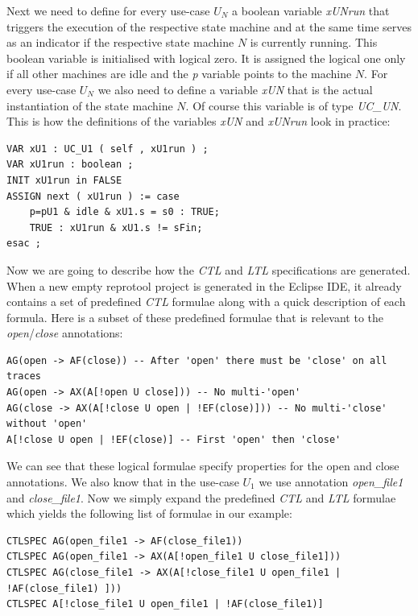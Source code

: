 Next we need to define for every use-case $U_N$ a boolean variable \emph{xUNrun} that triggers the execution of the respective state machine and at the same time serves as an indicator if the respective state machine $N$ is currently running.
This boolean variable is initialised with logical zero.
It is assigned the logical one only if all other machines are idle and the \emph{p} variable points to the machine $N$. For every use-case $U_N$ we also need to define a variable \emph{xUN} that is the actual instantiation of the state machine $N$.
Of course this variable is of type \emph{UC\_UN}.
This is how the definitions of the variables \emph{xUN} and \emph{xUNrun} look in practice:
\begin{lstlisting}
VAR xU1 : UC_U1 ( self , xU1run ) ;
VAR xU1run : boolean ;
INIT xU1run in FALSE
ASSIGN next ( xU1run ) := case
	p=pU1 & idle & xU1.s = s0 : TRUE;
	TRUE : xU1run & xU1.s != sFin;
esac ;
\end{lstlisting}

Now we are going to describe how the \emph{CTL} and \emph{LTL} specifications are generated.
When a new empty reprotool project is generated in the Eclipse \ac{IDE}, it already contains a set of predefined \emph{CTL} formulae along with a quick description of each formula.
Here is a subset of these predefined formulae that is relevant to the \emph{open}/\emph{close} annotations:

\begin{lstlisting}
AG(open -> AF(close)) -- After 'open' there must be 'close' on all traces
AG(open -> AX(A[!open U close])) -- No multi-'open'
AG(close -> AX(A[!close U open | !EF(close)])) -- No multi-'close' without 'open'
A[!close U open | !EF(close)] -- First 'open' then 'close'
\end{lstlisting}

We can see that these logical formulae specify properties for the open and close annotations.
We also know that in the use-case $U_1$ we use annotation \emph{open\_file1} and \emph{close\_file1}.
Now we simply expand the predefined \emph{CTL} and \emph{LTL} formulae which yields the following list of formulae in our example:
\begin{lstlisting}
CTLSPEC AG(open_file1 -> AF(close_file1))
CTLSPEC AG(open_file1 -> AX(A[!open_file1 U close_file1]))
CTLSPEC AG(close_file1 -> AX(A[!close_file1 U open_file1 | !AF(close_file1) ]))
CTLSPEC A[!close_file1 U open_file1 | !AF(close_file1)]
\end{lstlisting}

